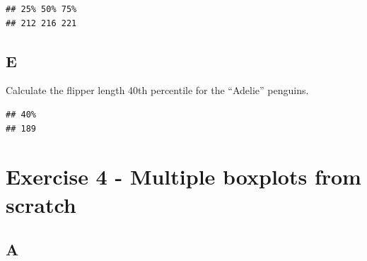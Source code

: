 \documentclass[
]{article}
\newenvironment{Shaded}{\begin{snugshade}}{\end{snugshade}}
\newcommand{\AttributeTok}[1]{\textcolor[rgb]{0.13,0.29,0.53}{#1}}
\newcommand{\ConstantTok}[1]{\textcolor[rgb]{0.56,0.35,0.01}{#1}}
\newcommand{\FloatTok}[1]{\textcolor[rgb]{0.00,0.00,0.81}{#1}}
\newcommand{\FunctionTok}[1]{\textcolor[rgb]{0.13,0.29,0.53}{\textbf{#1}}}
\newcommand{\NormalTok}[1]{#1}
\newcommand{\OtherTok}[1]{\textcolor[rgb]{0.56,0.35,0.01}{#1}}
\newcommand{\SpecialCharTok}[1]{\textcolor[rgb]{0.81,0.36,0.00}{\textbf{#1}}}
\newcommand{\StringTok}[1]{\textcolor[rgb]{0.31,0.60,0.02}{#1}}
\begin{document}
\begin{Shaded}
\end{Shaded}

\begin{verbatim}
## 25% 50% 75% 
## 212 216 221
\end{verbatim}

\hypertarget{e-1}{%
\subsection{E}\label{e-1}}

Calculate the flipper length 40th percentile for the ``Adelie''
penguins.

\begin{Shaded}
\end{Shaded}

\begin{verbatim}
## 40% 
## 189
\end{verbatim}

\hypertarget{exercise-4---multiple-boxplots-from-scratch}{%
\section{Exercise 4 - Multiple boxplots from
scratch}\label{exercise-4---multiple-boxplots-from-scratch}}

\hypertarget{a-3}{%
\subsection{A}\label{a-3}}
\end{document}
